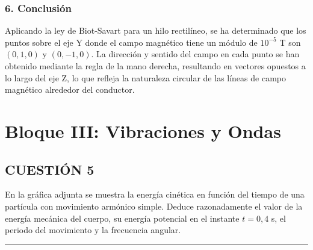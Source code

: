\subsubsection*{6. Conclusión}
\begin{cajaconclusion}
Aplicando la ley de Biot-Savart para un hilo rectilíneo, se ha determinado que los puntos sobre el eje Y donde el campo magnético tiene un módulo de $10^{-5}$ T son $(0, 1, 0)$ y $(0, -1, 0)$. La dirección y sentido del campo en cada punto se han obtenido mediante la regla de la mano derecha, resultando en vectores opuestos a lo largo del eje Z, lo que refleja la naturaleza circular de las líneas de campo magnético alrededor del conductor.
\end{cajaconclusion}

\newpage
\section{Bloque III: Vibraciones y Ondas}
\label{sec:vib_2024_jun_ord}

\subsection{CUESTIÓN 5}
\label{subsec:C5_2024_jun_ord}

\begin{cajaenunciado}
En la gráfica adjunta se muestra la energía cinética en función del tiempo de una partícula con movimiento armónico simple. Deduce razonadamente el valor de la energía mecánica del cuerpo, su energía potencial en el instante $t=0,4$ s, el periodo del movimiento y la frecuencia angular.
\end{cajaenunciado}
\hrule

